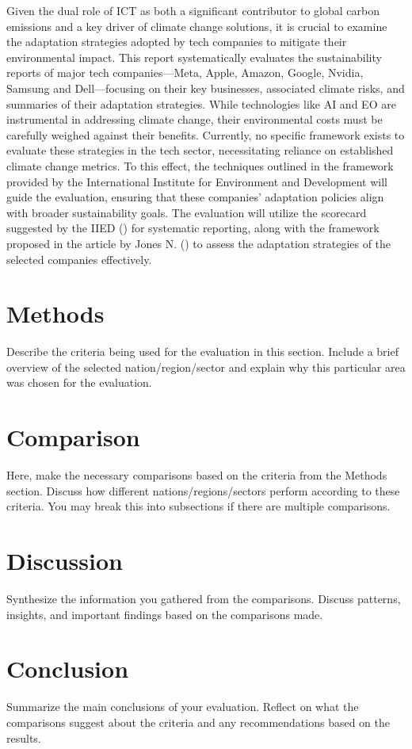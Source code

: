 \documentclass[12pt]{article}
\begin{document}
Given the dual role of ICT as both a significant contributor to global carbon emissions and a key driver of climate change solutions, it is crucial to examine the adaptation strategies adopted by tech companies to mitigate their environmental impact. This report systematically evaluates the sustainability reports of major tech companies—Meta, Apple, Amazon, Google, Nvidia, Samsung and Dell—focusing on their key businesses, associated climate risks, and summaries of their adaptation strategies. While technologies like  AI and EO are instrumental in addressing climate change, their environmental costs must be carefully weighed against their benefits. Currently, no specific framework exists to evaluate these strategies in the tech sector, necessitating reliance on established climate change metrics. To this effect, the techniques outlined in the framework provided by the International Institute for Environment and Development will guide the evaluation, ensuring that these companies’ adaptation policies align with broader sustainability goals. The evaluation will utilize the scorecard suggested by the IIED (\cite{craft_2016}) for systematic reporting, along with the framework proposed in the article by Jones N. (\cite{jones_2001}) to assess the adaptation strategies of the selected companies effectively.


\section*{Methods}
Describe the criteria being used for the evaluation in this section. Include a brief overview of the selected nation/region/sector and explain why this particular area was chosen for the evaluation.

\section*{Comparison}
Here, make the necessary comparisons based on the criteria from the Methods section. Discuss how different nations/regions/sectors perform according to these criteria. You may break this into subsections if there are multiple comparisons.

\section*{Discussion}
Synthesize the information you gathered from the comparisons. Discuss patterns, insights, and important findings based on the comparisons made.

\section*{Conclusion}
Summarize the main conclusions of your evaluation. Reflect on what the comparisons suggest about the criteria and any recommendations based on the results.

\newpage
\printbibliography
\end{document}
